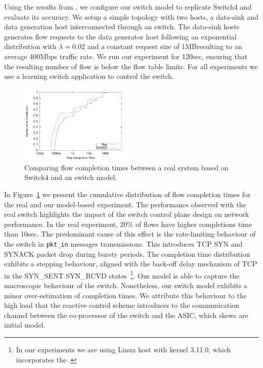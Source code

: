 
Using the results from \oflops, we configure our switch model to replicate
Switch4 and evaluate its accuracy. We setup a simple topology with two hosts, a
data-sink and data generation host interconnected through an \of switch. The
data-sink hosts generates flow requests to the data generator host following an
exponential distribution with $\lambda=0.02$ and a constant request size of
1MB\@ resulting to an average 400Mbps traffic rate. We run our experiment for
120sec, ensuring that the resulting number of flow is below the flow table
limits. For all experiments we use a learning switch application to control the switch. 

\begin{figure}[t] 
  \centering
  \includegraphics[width=0.48\textwidth]{Chapter1/Chapter1Figs/2hosts-cumm} 
  \caption{Comparing flow completion times between a real system based on
    Switch4 and an \sdnsim switch model.} 
  \label{fig:eval:switch-perf} 
\end{figure}


In Figure~\ref{fig:eval:switch-perf} we present the cumulative distribution of
flow completion times for the real and our model-based experiment. The
performance observed with the real switch highlights the impact of the switch
control plane design on network performance.  In the real experiment, 20\% of
flows have higher completions time than 10sec. The predominant cause of this
effect is the rate-limiting behaviour of the switch in \texttt{pkt\_in} messages
transmissions. This introduces TCP SYN and SYNACK packet drop during bursty
periods. The completion time distribution exhibits a stepping behaviour, aligned
with the back-off delay mechanism of TCP in the SYN\_SENT SYN\_RCVD
states~\footnote{In our experiments we are using Linux host with kernel 3.11.0,
  which incorporates the \cite{Cheng13}.}. Our model is able to capture the
macroscopic behaviour of the switch. Nonetheless, our switch model exhibits a
minor over-estimation of completion times. We attribute this behaviour to the
high load that the reactive control scheme introduces to the communication
channel between the co-processor of the switch and the ASIC, which skews are
initial model. 

